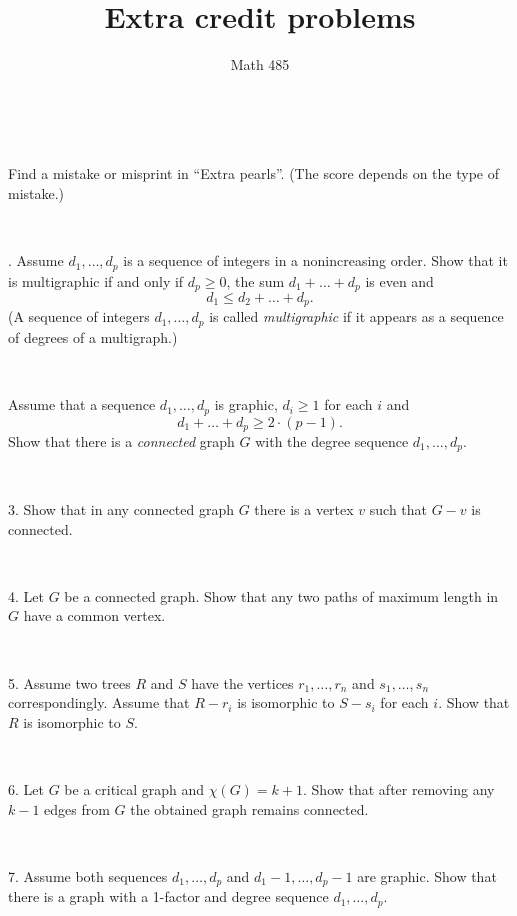 \documentclass[oneside,a4paper]{article}
\begin{document}
%
\title{Extra credit problems}
\author{Math 485}
\date{}
\maketitle

\textit{}


\ 

 Find a mistake or misprint in ``Extra pearls''.
(The score depends on the type of mistake.)


\ 

.
Assume $d_1,\dots, d_p$ is a sequence of integers in a nonincreasing order.
Show that it is multigraphic if and only if $d_p\ge0$, the sum $d_1+\dots+ d_p$ is even and 
\[d_1\le d_2+\dots+d_p.\]
(A sequence of integers $d_1,\dots, d_p$ is called \textit{multigraphic} if it appears as a sequence of degrees of a multigraph.)

\ 

Assume that a sequence $d_1,\dots, d_p$ is graphic,
$d_i\ge 1$ for each $i$ and 
\[d_1+\dots+d_p\ge 2\cdot(p-1).\]
Show that there is a \textit{connected} graph $G$ with the degree sequence $d_1,\dots, d_p$.


\ 

\noindent 
{3.}
Show that in any connected graph $G$ there is a vertex $v$ such that $G-v$ is connected.

\ 


\noindent
{4.} 
Let $G$ be a  connected graph.
Show that any two paths of maximum length in $G$ have a common vertex.


\ 

\noindent %
{5.} %
Assume two trees $R$ and $S$ 
have the vertices $r_1,\dots,r_n$ and $s_1,\dots,s_n$ correspondingly.
Assume that $R-r_i$ is isomorphic to $S-s_i$ for each $i$.
Show that $R$ is isomorphic to $S$.

\ 

\noindent 
{6.} %
Let $G$ be a critical graph and $\chi(G)=k+1$.
Show that after removing any $k-1$ edges from $G$  
the obtained graph remains connected. 

\ 

\noindent %
{7.} %
Assume both sequences $d_1,\dots, d_p$
 and $d_1-1,\dots, d_p-1$ are graphic.
Show that there is a graph with a 1-factor and degree sequence $d_1,\dots, d_p$.

\ 
\end{document}
